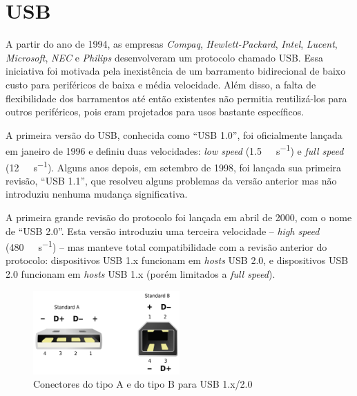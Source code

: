 \documentclass[brazil,pagestart=firstchapter]{abnt}
\begin{document}
\newpage


\section{USB}
\label{sec:usb}


A partir do ano de 1994, as empresas \textit{Compaq},
\textit{Hewlett-Packard}, \textit{Intel}, \textit{Lucent},
\textit{Microsoft}, \textit{NEC} e \textit{Philips} desenvolveram um
protocolo chamado \ac{USB}. Essa iniciativa foi motivada pela inexistência
de um barramento bidirecional de baixo custo para periféricos de baixa e
média velocidade. Além disso, a falta de flexibilidade dos barramentos até
então existentes não permitia reutilizá-los para outros periféricos, pois
eram projetados para usos bastante específicos. \cite{usb20}

A primeira versão do \ac{USB}, conhecida como ``USB 1.0'', foi oficialmente
lançada em janeiro de 1996 e definiu duas velocidades: \textit{low speed}
(\SI{1.5}{\mega\bit\per\second}) e \textit{full speed}
(\SI{12}{\mega\bit\per\second}). Alguns anos depois, em setembro de 1998, foi
lançada sua primeira revisão, ``USB 1.1'', que resolveu alguns problemas da
versão anterior mas não introduziu nenhuma mudança significativa.

A primeira grande revisão do protocolo foi lançada em abril de 2000, com o
nome de ``USB 2.0''. Esta versão introduziu uma terceira velocidade --
\textit{high speed} (\SI{480}{\mega\bit\per\second}) -- mas manteve total
compatibilidade com a revisão anterior do protocolo: dispositivos USB 1.x
funcionam em \textit{hosts} USB 2.0, e dispositivos USB 2.0 funcionam em
\textit{hosts} USB 1.x (porém limitados a \textit{full speed}).

\begin{figure}[h]
\centering
\includegraphics[width=0.5\textwidth]{img/USB.png}
\caption{Conectores do tipo A e do tipo B para USB 1.x/2.0}
\label{fig:usb_connectors}
\end{figure}
\end{document}
